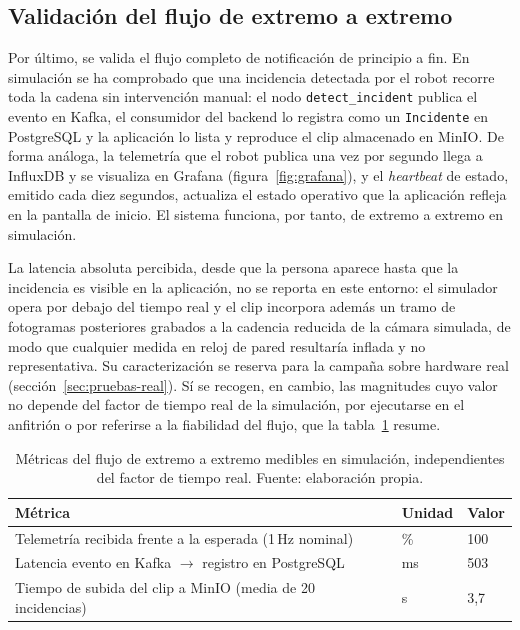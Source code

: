 \subsection{Validación del flujo de extremo a extremo}
\label{sec:resultados-e2e}

Por último, se valida el flujo completo de notificación de principio a fin. En simulación se ha
comprobado que una incidencia detectada por el robot recorre toda la cadena sin intervención
manual: el nodo \texttt{detect\_incident} publica el evento en Kafka, el consumidor del backend
lo registra como un \texttt{Incidente} en PostgreSQL y la aplicación lo lista y reproduce el
clip almacenado en MinIO. De forma análoga, la telemetría que el robot publica una vez por
segundo llega a InfluxDB y se visualiza en Grafana (figura~\ref{fig:grafana}), y el
\textit{heartbeat} de estado, emitido cada diez segundos, actualiza el estado operativo que la
aplicación refleja en la pantalla de inicio. El sistema funciona, por tanto, de extremo a
extremo en simulación.

La latencia absoluta percibida, desde que la persona aparece hasta que la incidencia es visible
en la aplicación, no se reporta en este entorno: el simulador opera por debajo del tiempo real y
el clip incorpora además un tramo de fotogramas posteriores grabados a la cadencia reducida de
la cámara simulada, de modo que cualquier medida en reloj de pared resultaría inflada y no
representativa. Su caracterización se reserva para la campaña sobre hardware real
(sección~\ref{sec:pruebas-real}). Sí se recogen, en cambio, las magnitudes cuyo valor no depende
del factor de tiempo real de la simulación, por ejecutarse en el anfitrión o por referirse a la
fiabilidad del flujo, que la tabla~\ref{tab:metricas-e2e} resume.

\begin{table}[htbp]
  \centering
  \small
  \caption{Métricas del flujo de extremo a extremo medibles en simulación, independientes del
  factor de tiempo real. Fuente: elaboración propia.}
  \label{tab:metricas-e2e}
  \begin{tabular}{@{}>{\raggedright\arraybackslash}p{7.5cm} l l@{}}
    \toprule
    \textbf{Métrica} & \textbf{Unidad} & \textbf{Valor} \\
    \midrule
    Telemetría recibida frente a la esperada (1\,Hz nominal)      & \% & 100 \\
    Latencia evento en Kafka $\rightarrow$ registro en PostgreSQL & ms & 503 \\
    Tiempo de subida del clip a MinIO (media de 20 incidencias)   & s  & 3,7 \\
    \bottomrule
  \end{tabular}
\end{table}

